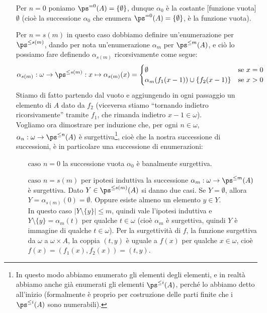 \documentclass[11pt]{scrartcl}
\begin{document}
	\begin{itemize}
		\item[$\boxed{\text{Per $n = 0$}}$] poniamo $\ps^{=0}(A) = \{\emptyset\}$, dunque $\alpha_0$ è la costante [funzione vuota] $\emptyset$ (cioè la successione $\alpha_0$ che enumera $\ps^{=0}(A) = \{\emptyset\}$, è la funzione vuota).
		\item[$\boxed{\text{Per $n = s(m)$}}$] in questo caso dobbiamo definire un'enumerazione per $\ps^{\leq s(m)}$, dando per nota un'enumerazione $\alpha_m$ per $\ps^{\leq m}(A)$, e ciò lo possiamo fare definendo $\alpha_{s(m)}$ ricorsivamente come segue:
		\[ 	\alpha_{s(m)} : \omega \rightarrow \ps^{\leq s(m)} : x \mapsto
			\alpha_{s(m)}(x) = \begin{cases}
			\emptyset &\text{se $x = 0$} \\
			\alpha_m(f_1(x-1)) \cup \{f_2(x - 1)\} &\text{se $x > 0$}
		\end{cases}
			\]
		Stiamo di fatto partendo dal vuoto e aggiungendo in ogni passaggio un elemento di $A$ dato da $f_2$ (viceversa stiamo ``tornando indietro ricorsivamente'' tramite $f_1$, che rimanda indietro $x-1 \in \omega$).\\
		Vogliamo ora dimostrare per induzione che, per ogni $n \in \omega$, $\alpha_n : \omega \rightarrow \ps^{\leq n} (A)$ è surgettiva\footnote{In questo modo abbiamo enumerato gli elementi degli elementi, e in realtà abbiamo anche
		già enumerati gli elementi $\ps^{\leq i}(A)$, perché lo abbiamo detto all'inizio (formalmente è proprio per costruzione delle parti finite che i $\ps^{\leq i}(A)$ sono numerabili).}, cioè che la nostra successione di successioni, è in particolare una successione di enumerazioni:
		\begin{itemize}
			\item[$\boxed{\text{caso $n = 0$}}$] la successione vuota $\alpha_0$ è banalmente surgettiva.
			\item[$\boxed{\text{caso $n = s(m)$}}$] per ipotesi induttiva la successione $\alpha_m : \omega \rightarrow \ps^{\leq m}(A)$ è surgettiva. Dato $Y \in \ps^{\leq s(m)}(A)$ si danno due casi.
			Se $Y = \emptyset$, allora $Y = \alpha_{s(m)}(0) = \emptyset$. Oppure esiste almeno un elemento $y \in Y$.\\
			In questo caso $|Y\setminus\{y\}| \leq m$, quindi vale l'ipotesi induttiva e $Y \setminus\{y\} = \alpha_m(t)$ per qualche $t \in \omega$ (cioè $\alpha_m$ è surgettiva, quindi $Y$ è immagine di qualche $t \in \omega$).
			Per la surgettività di $f$, la funzione surgettiva da $\omega$ a $\omega \times A$, la coppia $(t,y)$ è uguale a $f(x)$ per qualche $x \in \omega$, cioè $f(x) = (f_1(x),f_2(x)) = (t,y)$.

\end{itemize}
\end{itemize}
\end{document}
